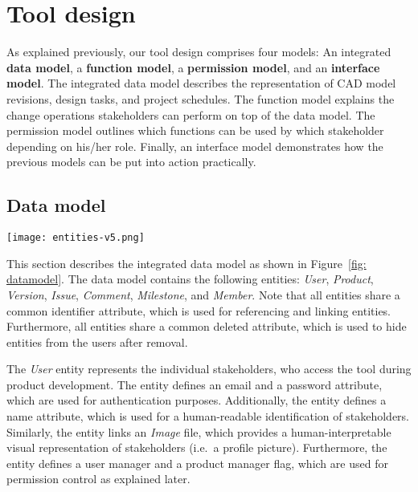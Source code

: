 \section{Tool design}
    \label{sec:contribution}

    As explained previously, our tool design comprises four models: An integrated \textbf{data model}, a \textbf{function model}, a \textbf{permission model}, and an \textbf{interface model}.
    The integrated data model describes the representation of CAD model revisions, design tasks, and project schedules.
    The function model explains the change operations stakeholders can perform on top of the data model.
    The permission model outlines which functions can be used by which stakeholder depending on his/her role.
    Finally, an interface model demonstrates how the previous models can be put into action practically.

    \subsection*{Data model}

    \begin{figure*}[ht]
        \centering
        \texttt{[image: entities-v5.png]}
        \caption{Integrated data model for improved information exchange between customers, project managers, requirements engineers, and product designers}
        \label{fig: datamodel}
    \end{figure*}

    This section describes the integrated data model as shown in Figure~\ref{fig: datamodel}.
    The data model contains the following entities: \textit{User}, \textit{Product}, \textit{Version}, \textit{Issue}, \textit{Comment}, \textit{Milestone}, and \textit{Member}.
    Note that all entities share a common identifier attribute, which is used for referencing and linking entities.
    Furthermore, all entities share a common deleted attribute, which is used to hide entities from the users after removal.

    The \textit{User} entity represents the individual stakeholders, who access the tool during product development.
    The entity defines an email and a password attribute, which are used for authentication purposes.
    Additionally, the entity defines a name attribute, which is used for a human-readable identification of stakeholders.
    Similarly, the entity links an \textit{Image} file, which provides a human-interpretable visual representation of stakeholders (i.e.\ a profile picture).
    Furthermore, the entity defines a user manager and a product manager flag, which are used for permission control as explained later.
    
